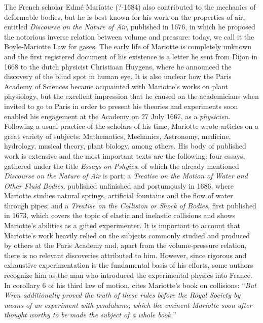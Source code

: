 The French scholar Edm\'e Mariotte (?-1684) also contributed to the mechanics of deformable bodies, but he is best known for his work on the properties of air, entitled \emph{Discourse on the Nature of Air}, published in 1676, in which he proposed the notorious inverse relation between volume and pressure: today, we call it the Boyle-Mariotte Law for gases. The early life of Mariotte is completely unknown and the first registered document of his existence is a letter he sent from Dijon in 1668 to the dutch physicist Christiaan Huygens, where he announced the discovery of the blind spot in human eye. It is also unclear how the Paris Academy of Sciences became acquainted with Mariotte's works on plant physiology, but the excellent impression that he caused on the academicians when invited to go to Paris in order to present his theories and experiments soon enabled his engagement at the Academy on 27 July 1667, as a \emph{physicien}. Following a usual practice of the scholars of his time, Mariotte wrote articles on a great variety of subjects: Mathematics, Mechanics, Astronomy, medicine, hydrology, musical theory, plant biology, among others. His body of published work is extensive and the most important texts are the following: four essays, gathered under the title \emph{Essays on Pshyics}, of which the already mentioned \emph{Discourse on the Nature of Air} is part; a \emph{Treatise on the Motion of Water and Other Fluid Bodies}, published unfinished and postumously in 1686, where Mariotte studies natural springs, artificial fountains and the flow of water through pipes; and a \emph{Treatise on the Collision or Shock of Bodies}, first published in 1673, which covers the topic of elastic and inelastic collisions and shows Mariotte's abilities as a gifted experimenter. It is important to account that Mariotte's work heavily relied on the subjects commonly studied and produced by others at the Paris Academy and, apart from the volume-pressure relation, there is no relevant discoveries attributed to him. However, since rigorous and exhaustive experimentation is the fundamental basis of his efforts, some authors recognize him as the man who introduced the experimental physics into France. In corollary 6 of his third law of motion, \cite{newton_1999_1} cites Mariotte's book on collisions: ``\emph{But Wren additionally proved the truth of these rules before the Royal Society by means of an experiment with pendulums, which the eminent Mariotte soon after thought worthy to be made the subject of a whole book.}''
  

